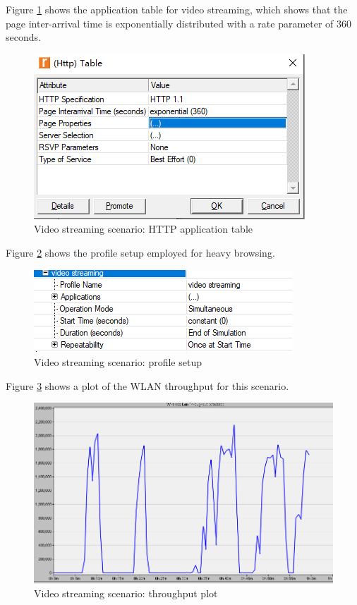 Figure \ref{fig:simul:riverbed:video:2} shows the application table for video streaming, which shows that the page inter-arrival time is exponentially distributed with a rate parameter of 360 seconds.

\begin{figure}[H]
	\centering
	\includegraphics[scale=0.6]{Figures/amantianrenamed/ScenarionHttpapplicationtablevideostreaming.png}
	\caption[Video streaming scenario: HTTP application table]{Video streaming scenario: \gls{HTTP} application table}
	\label{fig:simul:riverbed:video:2}
\end{figure}

Figure \ref{fig:simul:riverbed:video:3} shows the profile setup employed for heavy browsing.

\begin{figure}[H]
	\centering
	\includegraphics[scale=0.6]{Figures/amantianrenamed/ScenariooneVideostreamingProfileetup.png}
	\caption{Video streaming scenario: profile setup}
	\label{fig:simul:riverbed:video:3}
\end{figure}

Figure \ref{fig:simul:riverbed:video:4} shows a plot of the \gls{WLAN} throughput for this scenario.

\begin{figure}[H]
	\centering
	\includegraphics[scale=0.47]{Figures/amantianrenamed/ScenarioThroughputvideostreaming.png}
	\caption{Video streaming scenario: throughput plot}
	\label{fig:simul:riverbed:video:4}
\end{figure}

